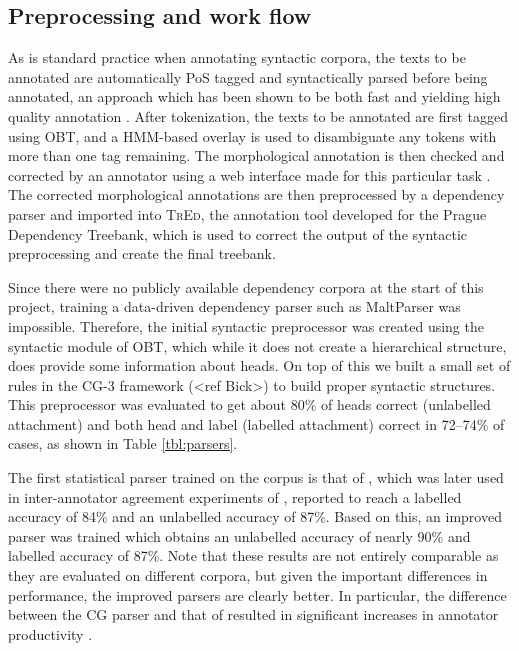 \documentclass[11pt,a4paper]{article}
\let\app=\textsc
\begin{document}
\subsection{Preprocessing and work flow}
As is standard practice when annotating syntactic corpora, the texts to be
annotated are automatically PoS tagged and syntactically parsed before being
annotated, an approach which has been shown to be both fast and yielding
high quality annotation \cite{Mar:San:Mar:93,For:Sag:10,Skjaerholt:13}.
After tokenization, the texts to be annotated are first tagged using OBT, and
a HMM-based overlay \cite{Johannessen:etal:12} is used to disambiguate any
tokens with more than one tag remaining. The morphological annotation is then
checked and corrected by an annotator using a web interface made for this
particular task \cite{Lyn:13}. The corrected morphological annotations are
then preprocessed by a dependency parser and imported into \app{TrEd}, the
annotation tool developed for the Prague Dependency Treebank, which is used to
correct the output of the syntactic preprocessing and create the final
treebank.

Since there were no publicly available dependency corpora at the start of this
project, training a data-driven dependency parser such as MaltParser was
impossible. Therefore, the initial syntactic preprocessor was created using
the syntactic module of OBT, which while it does not create a hierarchical
structure, does provide some information about heads. On top of this we built
a small set of rules in the CG-3 framework (<ref Bick>) to build proper
syntactic structures. This preprocessor was evaluated to get about 80\% of
heads correct (unlabelled attachment) and both head and label (labelled
attachment) correct in 72--74\% of cases, as shown in Table \ref{tbl:parsers}.

The first statistical parser trained on the corpus is that of
, which was later used in inter-annotator agreement
experiments of , reported to reach a labelled accuracy of
84\% and an unlabelled accuracy of 87\%. Based on this, an improved parser was
trained which obtains an unlabelled accuracy of nearly 90\% and labelled
accuracy of 87\%. Note that these results are not entirely comparable as they
are evaluated on different corpora, but given the important differences in
performance, the improved parsers are clearly better. In particular, the
difference between the CG parser and that of  resulted in
significant increases in annotator productivity \cite{Skjaerholt:13}.
\end{document}
